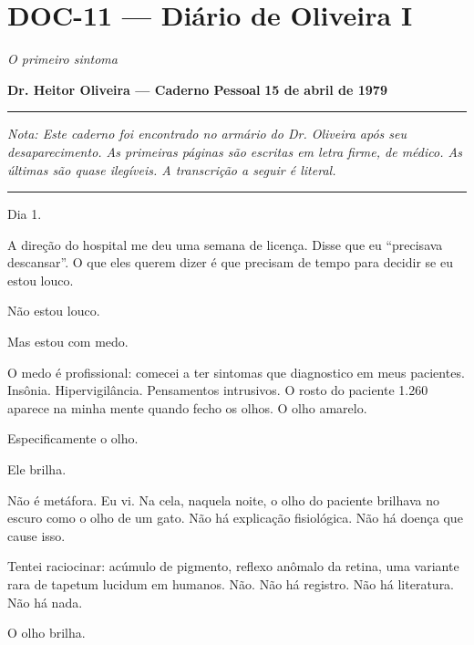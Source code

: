 \section*{\textbf{DOC-11} --- Diário de Oliveira I}

\noindent \textit{O primeiro sintoma}

\noindent \textbf{Dr. Heitor Oliveira --- Caderno Pessoal}
\textbf{15 de abril de 1979}

\vspace{0.5em}\noindent\rule{\textwidth}{0.5pt}\vspace{0.5em}

\noindent \textit{Nota: Este caderno foi encontrado no armário do Dr. Oliveira após seu desaparecimento. As primeiras páginas são escritas em letra firme, de médico. As últimas são quase ilegíveis. A transcrição a seguir é literal.}

\vspace{0.5em}\noindent\rule{\textwidth}{0.5pt}\vspace{0.5em}

\noindent Dia 1.

\noindent A direção do hospital me deu uma semana de licença. Disse que eu \textquotedblleft{}precisava descansar\textquotedblright{}. O que eles querem dizer é que precisam de tempo para decidir se eu estou louco.

\noindent Não estou louco.

\noindent Mas estou com medo.

\noindent O medo é profissional: comecei a ter sintomas que diagnostico em meus pacientes. Insônia. Hipervigilância. Pensamentos intrusivos. O rosto do paciente 1.260 aparece na minha mente quando fecho os olhos. O olho amarelo.

\noindent Especificamente o olho.

\noindent Ele brilha.

\noindent Não é metáfora. Eu vi. Na cela, naquela noite, o olho do paciente brilhava no escuro como o olho de um gato. Não há explicação fisiológica. Não há doença que cause isso.

\noindent Tentei raciocinar: acúmulo de pigmento, reflexo anômalo da retina, uma variante rara de tapetum lucidum em humanos. Não. Não há registro. Não há literatura. Não há nada.

\noindent O olho brilha.


